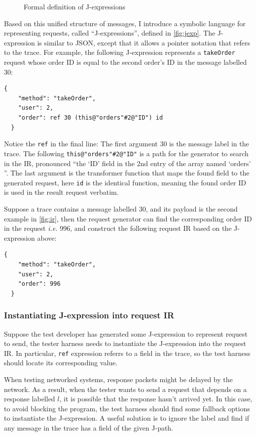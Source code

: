\documentclass{article}
\newcommand{\ilc}[1]{\lstinline[style=customcoq]{#1}}
\newcommand{\ilj}[1]{\lstinline[style=json]{#1}}
\theoremstyle{definition}
\begin{document}
\begin{figure}
  \ottall
  \caption{Formal definition of J-expressions}
  \label{fig:jexp}
\end{figure}

Based on this unified structure of messages, I introduce a symbolic language for
representing requests, called ``J-expressions'', defined in \autoref{fig:jexp}.
The J-expression is similar to JSON, except that it allows a pointer notation
that refers to the trace.  For example, the following J-expression represents a
\ilc{takeOrder} request whose order ID is equal to the second order's ID in the
message labelled 30:
\begin{lstlisting}[style=json]
  {
    "method": "takeOrder",
    "user": 2,
    "order": ref 30 (this@"orders"#2@"ID") id
  }
\end{lstlisting}

Notice the \ilc{ref} in the final line: The first argument 30 is the message
label in the trace.  The following \ilj{this@"orders"#2@"ID"} is a path for the
generator to search in the IR, pronounced ``the `ID' field in the 2nd entry of
the array named `orders' ''.  The last argument is the transformer function that
maps the found field to the generated request, here \ilj{id} is the identical
function, meaning the found order ID is used in the result request verbatim.

Suppose a trace contains a message labelled 30, and its payload is the second
example in \autoref{fig:ir}, then the request generator can find the
corresponding order ID in the request {\it i.e.}  996, and construct the
following request IR based on the J-expression above:

\begin{lstlisting}[style=json]
  {
    "method": "takeOrder",
    "user": 2,
    "order": 996
  }
\end{lstlisting}

\subsubsection{Instantiating J-expression into request IR}
Suppose the test developer has generated some J-expression to represent request
to send, the tester harness needs to instantiate the J-expression into the
request IR.  In particular, \ilj{ref} expression referrs to a field in the
trace, so the test harness should locate its corresponding value.

When testing networked systems, response packets might be delayed by the
network.  As a result, when the tester wants to send a request that depends on a
response labelled $l$, it is possible that the response hasn't arrived yet.  In
this case, to avoid blocking the program, the test harness should find some
fallback options to instantiate the J-expression.  A useful solution is to
ignore the label and find if any message in the trace has a field of the given
J-path.  
\end{document}

